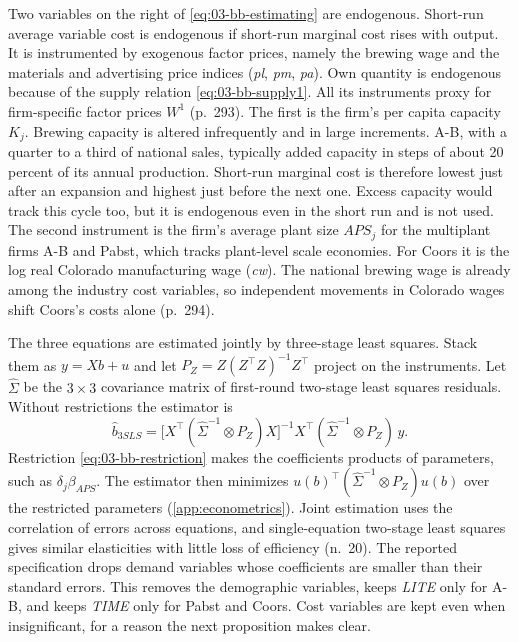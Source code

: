  Two variables on the right of \eqref{eq:03-bb-estimating} are endogenous. Short-run
average variable cost is endogenous if short-run marginal cost rises with output. It is instrumented by
exogenous factor prices, namely the brewing wage and the materials and advertising price indices
(\textit{pl}, \textit{pm}, \textit{pa}). Own quantity is endogenous because of the supply relation
\eqref{eq:03-bb-supply1}. All its instruments proxy for firm-specific factor prices $W^1$ (p.~293). The first
is the firm's per capita capacity $K_j$. Brewing capacity is altered infrequently and in large increments. A-B, with a quarter to a third of national sales, typically added
capacity in steps of about 20 percent of its annual production. Short-run marginal cost is therefore lowest
just after an expansion and highest just before the next one. Excess capacity would track this cycle too, but
it is endogenous even in the short run and is not used. The second instrument is the firm's average plant
size $\mathit{APS}_j$ for the multiplant firms A-B and Pabst, which tracks plant-level scale economies. For
Coors it is the log real Colorado manufacturing wage (\textit{cw}). The national brewing wage is already
among the industry cost variables, so independent movements in Colorado wages shift Coors's costs alone
(p.~294).

 The three equations are estimated jointly by three-stage least squares. Stack them as $y
= X b + u$ and let $P_Z = Z(Z^\top Z)^{-1}Z^\top$ project on the instruments. Let $\hat\Sigma$ be the $3
\times 3$ covariance matrix of first-round two-stage least squares residuals. Without restrictions the
estimator is
\begin{equation*}
  \hat b_{3SLS} = \bigl[X^\top(\hat\Sigma^{-1} \otimes P_Z)X\bigr]^{-1} X^\top(\hat\Sigma^{-1} \otimes P_Z)\, y .
\end{equation*}
Restriction \eqref{eq:03-bb-restriction} makes the coefficients products of parameters, such as $\delta_j
\beta_{APS}$. The estimator then minimizes $u(b)^\top(\hat\Sigma^{-1} \otimes P_Z)u(b)$ over the restricted
parameters (\cref{app:econometrics}). Joint estimation uses the correlation of errors across equations, and
single-equation two-stage least squares gives similar elasticities with little loss of efficiency (n.~20). The
reported specification drops demand variables whose coefficients are smaller than their standard errors.
This removes the demographic variables, keeps \textit{LITE} only for A-B, and keeps \textit{TIME} only for
Pabst and Coors. Cost variables are kept even when insignificant, for a reason the next proposition makes
clear.

